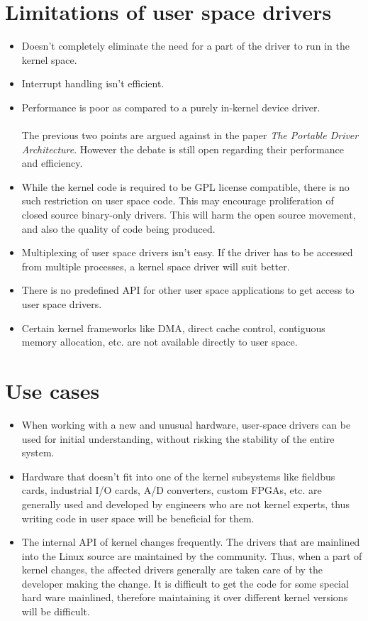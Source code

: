 \documentclass[twoside]{iitbreport}
\begin{document}
\section{Limitations of user space drivers}
\begin{itemize}
\item Doesn't completely eliminate the need for a part of the driver to run in the kernel space.
\item Interrupt handling isn't  efficient.
\item Performance is poor as compared to a purely in-kernel device driver.
\\\\The previous two points are argued against in the paper \textit{ The Portable Driver Architecture}\cite{Eschweiler2014TheArchitecture}. However the debate is still open regarding their performance and efficiency.
\item While the kernel code is required to be GPL license compatible, there is no such restriction on user space code. This may encourage proliferation
of closed source binary-only drivers. This will harm the open source movement, and also the quality of code being produced.
\item Multiplexing of user space drivers isn't easy. If the driver has to be accessed from multiple processes, a kernel space driver will suit better\cite{userSpaceDriversTldp}\cite{xilinxUIO}. 
\item There is no predefined API for other user space applications to get access to user space drivers.
\item Certain kernel frameworks like DMA, direct cache control, contiguous memory allocation, etc. are not available directly to user space.
\end{itemize}

\section{Use cases}
\begin{itemize}
\item When working with a new and unusual hardware, user-space drivers can be used for initial understanding, without risking the stability of the entire system.
\item Hardware that doesn't fit into one of the kernel subsystems like fieldbus cards, industrial I/O cards, A/D converters, custom FPGAs, etc. are generally used and developed by engineers who are not kernel experts, thus writing code in user space will be beneficial for them.
\item The internal API of kernel changes frequently. The drivers that are mainlined into the Linux source are maintained by the community. Thus, when a part of kernel changes, the affected drivers generally are taken care of by the developer making the change. It is difficult to get the code for some special hard ware mainlined, therefore maintaining it over different kernel versions will be difficult.


\end{itemize}
\end{document}
